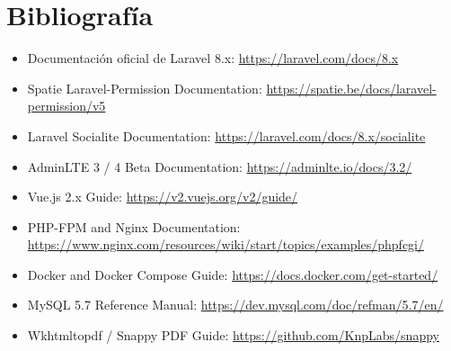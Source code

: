 \chapter{Bibliografía}
{\raggedright
\begin{itemize}
    \item Documentación oficial de Laravel 8.x: \url{https://laravel.com/docs/8.x}
    \item Spatie Laravel-Permission Documentation: \url{https://spatie.be/docs/laravel-permission/v5}
    \item Laravel Socialite Documentation: \url{https://laravel.com/docs/8.x/socialite}
    \item AdminLTE 3 / 4 Beta Documentation: \url{https://adminlte.io/docs/3.2/}
    \item Vue.js 2.x Guide: \url{https://v2.vuejs.org/v2/guide/}
    \item PHP-FPM and Nginx Documentation: \url{https://www.nginx.com/resources/wiki/start/topics/examples/phpfcgi/}
    \item Docker and Docker Compose Guide: \url{https://docs.docker.com/get-started/}
    \item MySQL 5.7 Reference Manual: \url{https://dev.mysql.com/doc/refman/5.7/en/}
    \item Wkhtmltopdf / Snappy PDF Guide: \url{https://github.com/KnpLabs/snappy}
\end{itemize}
}
